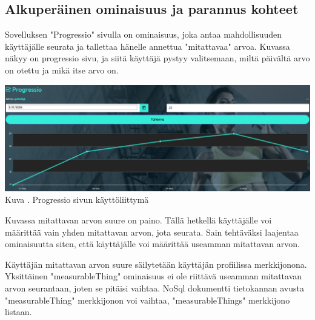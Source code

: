 

\subsection{Alkuperäinen ominaisuus ja parannus kohteet}





Sovelluksen "Progressio"{} sivulla on ominaisuus, 
joka antaa mahdollisuuden käyttäjälle seurata ja tallettaa hänelle annettua "mitattavaa"{} arvoa.
Kuvassa \nextImageCount {} näkyy on progressio sivu, 
ja siitä käyttäjä pystyy valitsemaan, miltä päivältä arvo on otettu ja mikä itse arvo on.
\medskip

\bigskip
\includegraphics[width =15cm]{src/public/progressiosingle.png}\\
Kuva \getImgCount {}. Progressio sivun käyttöliittymä 
\medskip



Kuvassa \theimgCounter {} mitattavan arvon suure on paino. 
% 
Tällä hetkellä käyttäjälle voi määrittää vain yhden mitattavan arvon, jota seurata.
Sain tehtäväksi laajentaa ominaisuutta siten, että käyttäjälle voi määrittää useamman mitattavan arvon.
\medskip


Käyttäjän mitattavan arvon suure säilytetään käyttäjän profiilissa merkkijonona. 
Yksittäinen "measurableThing"{} ominaisuus ei ole riittävä useamman mitattavan arvon seurantaan, joten se pitäisi vaihtaa.
%
NoSql dokumentti tietokannan avusta "measurableThing"{} merkkijonon voi vaihtaa, "measurableThings"{} merkkijono listaan.
\medskip






